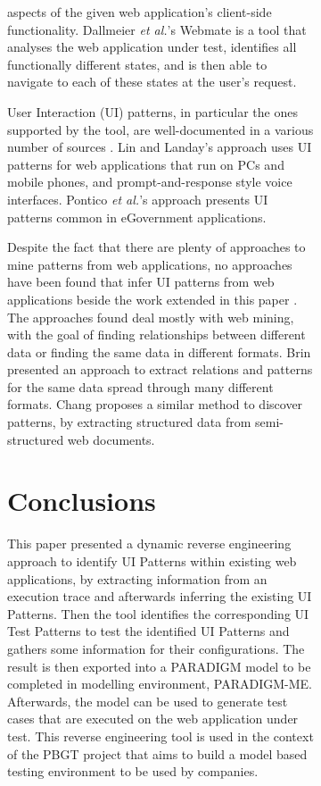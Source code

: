 \documentclass[conference]{IEEEtran}
\begin{document}
\begin{enumerate}
\begin{figure}[!htb]
\begin{itemize}
\begin{figure}[!htb]
\begin{itemize}
aspects of the given web application's client-side functionality.  Dallmeier \textit{et al.}'s Webmate \cite{dallmeier2012Webmate,dallmeier2013Webmate} is a tool that analyses the web application under test, identifies all functionally different states, and is then able to navigate to each of these states at the user’s request.

User Interaction (UI) patterns, in particular the ones supported by the tool, are well-documented in a various number of sources \cite{tidwell2010designing, van2001patterns, neil12standard,sinnig2005patterns}. Lin and Landay's approach \cite{lin2008employing} uses UI patterns for web applications that run on PCs and mobile phones, and prompt-and-response style voice interfaces. Pontico \textit{et al.}'s approach \cite{pontico2008organizing} presents UI patterns common in eGovernment applications.

Despite the fact that there are plenty of approaches to mine patterns from web applications, no approaches have been found that infer UI patterns from web applications beside the work extended in this paper \cite{nabuco2013inferring, morgado2012gui}. The approaches found deal mostly with web mining, with the goal of finding relationships between different data or finding the same data in different formats. Brin \cite{brin1999extracting} presented an approach to extract relations and patterns for the same data spread through many different formats. Chang \cite{chang2003automatic} proposes a similar method to discover patterns, by extracting structured data from semi-structured web documents.

\section{Conclusions}\label{sec:conc}

This paper presented a dynamic reverse engineering approach to identify UI Patterns within existing web applications, by extracting information from an execution trace and afterwards inferring the existing UI Patterns. Then the tool identifies the corresponding UI Test Patterns to test the identified UI Patterns and gathers some information for their configurations. The result is then exported into a PARADIGM model to be completed in modelling environment, PARADIGM-ME. Afterwards, the model can be used to generate test cases that are executed on the web application under test. This reverse engineering
tool is used in the context of the PBGT project that aims
to build a model based testing environment to be used by
companies.


\end{itemize}
\end{figure}
\end{itemize}
\end{figure}
\end{enumerate}
\end{document}
